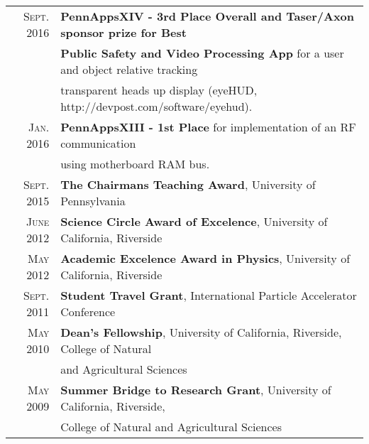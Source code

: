 \documentclass[a4paper,10pt]{article} %
\begin{document}
\begin{tabular}{rl}
\textsc{Sept.} 2016 & \textbf{PennAppsXIV - 3rd Place Overall and Taser/Axon sponsor prize for Best } \\
					& \textbf{Public Safety and Video Processing App} for a user and object relative tracking  \\
					& transparent heads up display (eyeHUD, http://devpost.com/software/eyehud). \\
\textsc{Jan.} 2016  & \textbf{PennAppsXIII - 1st Place } for implementation of an RF communication \\
 					& using motherboard RAM bus. \\
\textsc{Sept.} 2015 & \textbf{The Chairmans Teaching Award}, University of Pennsylvania \\
\textsc{June} 2012  & \textbf{Science Circle Award of Excelence}, University of California, Riverside \\
\textsc{May} 2012   & \textbf{Academic Excelence Award in Physics}, University of California, Riverside \\
\textsc{Sept.} 2011 & \textbf{Student Travel Grant}, International Particle Accelerator Conference \\
\textsc{May} 2010   & \textbf{Dean's Fellowship}, University of California, Riverside, College of Natural\\
				    & and Agricultural Sciences \\
\textsc{May} 2009   & \textbf{Summer Bridge to Research Grant}, University of California, Riverside, \\
			        & College of Natural and Agricultural Sciences \\

\end{tabular}








\end{document}
